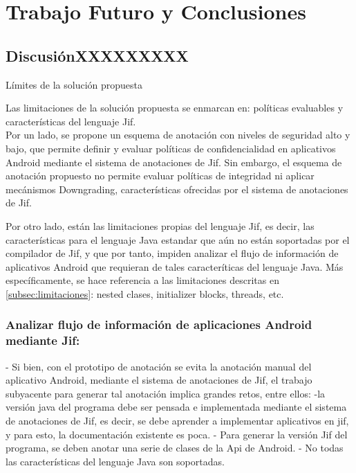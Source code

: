 \label{ch:trabajoFuturo}
\chapter{Trabajo Futuro y Conclusiones}
\section{DiscusiónXXXXXXXXX}
Límites de la solución propuesta\newline

Las limitaciones de la solución propuesta se enmarcan en: políticas evaluables y
características del lenguaje Jif.\\
Por un lado, se propone un esquema de anotación con niveles de seguridad alto y
bajo, que permite definir y evaluar políticas de confidencialidad en aplicativos
Android mediante el sistema de anotaciones de Jif.
Sin embargo, el esquema de anotación propuesto no permite evaluar políticas de
integridad ni aplicar mecánismos Downgrading, características ofrecidas por el
sistema de anotaciones de Jif.

Por otro lado, están las limitaciones propias del lenguaje Jif, es decir, las
características para el lenguaje Java estandar que aún no están soportadas por
el compilador de Jif, y que por tanto, impiden analizar el flujo de información
de aplicativos Android que requieran de tales caracteríticas del lenguaje Java.
Más específicamente, se hace referencia a las limitaciones descritas en
\ref{subsec:limitaciones}: nested clases, initializer blocks, threads, etc.

\subsection{Analizar flujo de información de aplicaciones Android mediante Jif:}
- Si bien, con el prototipo de anotación se evita la anotación manual del
aplicativo Android, mediante el sistema de anotaciones de Jif, el trabajo
subyacente para generar tal anotación implica grandes retos, entre ellos:\newline
-la versión java del programa debe ser pensada e implementada mediante el
sistema de anotaciones de Jif, es decir, se debe aprender a implementar
aplicativos en jif, y para esto, la documentación existente es poca.\newline
- Para generar la versión Jif del programa, se deben anotar una serie de clases
de la Api de Android.\newline
- No todas las características del lenguaje Java son soportadas.

